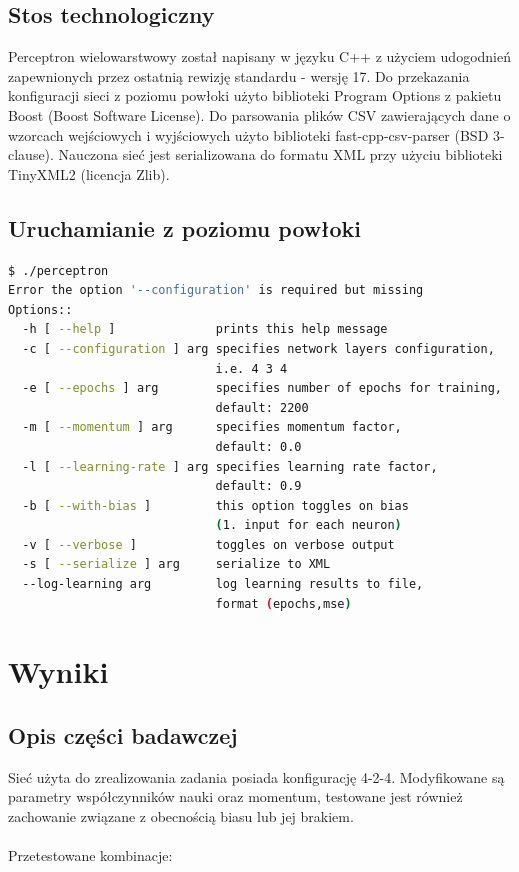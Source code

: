 \documentclass{classrep}
\begin{document}
\subsection{Stos technologiczny}
Perceptron wielowarstwowy został napisany w języku C++ z użyciem udogodnień zapewnionych przez ostatnią rewizję standardu - wersję 17. Do przekazania konfiguracji sieci z poziomu powłoki użyto biblioteki Program Options z pakietu Boost (Boost Software License). Do parsowania plików CSV zawierających dane o wzorcach wejściowych i wyjściowych użyto biblioteki fast-cpp-csv-parser (BSD 3-clause). Nauczona sieć jest serializowana do formatu XML przy użyciu biblioteki TinyXML2 (licencja Zlib).
\clearpage
\subsection{Uruchamianie z poziomu powłoki}
\begin{lstlisting}[language=bash]
$ ./perceptron 
Error the option '--configuration' is required but missing
Options::
  -h [ --help ]              prints this help message
  -c [ --configuration ] arg specifies network layers configuration,
                             i.e. 4 3 4
  -e [ --epochs ] arg        specifies number of epochs for training,
                             default: 2200
  -m [ --momentum ] arg      specifies momentum factor,
                             default: 0.0
  -l [ --learning-rate ] arg specifies learning rate factor,
                             default: 0.9
  -b [ --with-bias ]         this option toggles on bias
                             (1. input for each neuron)
  -v [ --verbose ]           toggles on verbose output
  -s [ --serialize ] arg     serialize to XML
  --log-learning arg         log learning results to file,
                             format (epochs,mse)
\end{lstlisting}

\section{Wyniki}
\subsection{Opis części badawczej}
Sieć użyta do zrealizowania zadania posiada konfigurację 4-2-4. Modyfikowane są parametry współczynników nauki oraz momentum, testowane jest również zachowanie związane z obecnością biasu lub jej brakiem.
\\~\\
Przetestowane kombinacje:
\end{document}
